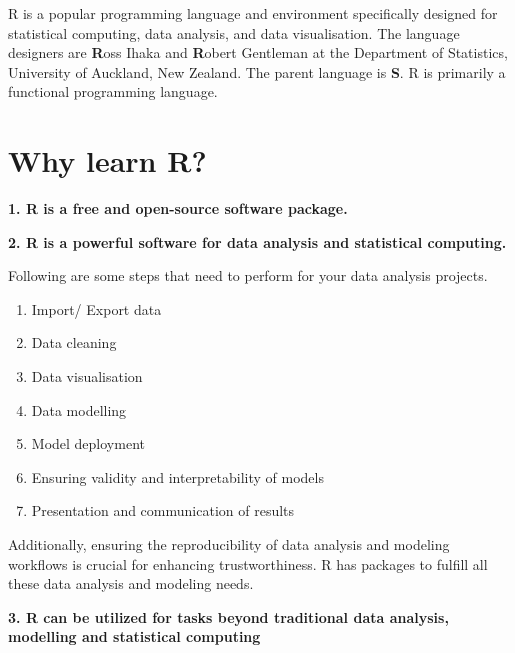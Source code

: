 \documentclass[
  letterpaper,
  DIV=11,
  numbers=noendperiod]{scrreprt}
\providecommand{\tightlist}{%
  \setlength{\itemsep}{0pt}\setlength{\parskip}{0pt}}\usepackage{longtable,booktabs,array}
\begin{document}
R is a popular programming language and environment specifically
designed for statistical computing, data analysis, and data
visualisation. The language designers are \textbf{R}oss Ihaka and
\textbf{R}obert Gentleman at the Department of Statistics, University of
Auckland, New Zealand. The parent language is \textbf{S}. R is primarily
a functional programming language.

\section{Why learn R?}\label{why-learn-r}

\textbf{1. R is a free and open-source software package.}

\textbf{2. R is a powerful software for data analysis and statistical
computing.}

Following are some steps that need to perform for your data analysis
projects.

\begin{enumerate}
\def\labelenumi{\arabic{enumi}.}
\tightlist
\item
  Import/ Export data
\item
  Data cleaning
\item
  Data visualisation
\item
  Data modelling
\item
  Model deployment
\item
  Ensuring validity and interpretability of models
\item
  Presentation and communication of results
\end{enumerate}

Additionally, ensuring the reproducibility of data analysis and modeling
workflows is crucial for enhancing trustworthiness. R has packages to
fulfill all these data analysis and modeling needs.

\textbf{3. R can be utilized for tasks beyond traditional data analysis,
modelling and statistical computing}
\end{document}
